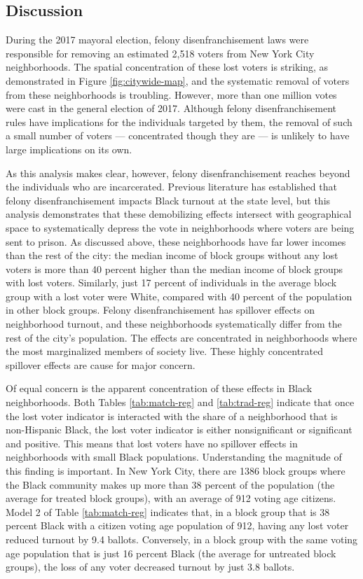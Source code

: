\documentclass[
  12pt,
]{article}
\begin{document}
\hypertarget{discussion}{%
\subsection*{Discussion}\label{discussion}}

During the 2017 mayoral election, felony disenfranchisement laws were responsible for removing an estimated 2,518 voters from New York City neighborhoods. The spatial concentration of these lost voters is striking, as demonstrated in Figure \ref{fig:citywide-map}, and the systematic removal of voters from these neighborhoods is troubling. However, more than one million votes were cast in the general election of 2017. Although felony disenfranchisement rules have implications for the individuals targeted by them, the removal of such a small number of voters --- concentrated though they are --- is unlikely to have large implications on its own.

As this analysis makes clear, however, felony disenfranchisement reaches beyond the individuals who are incarcerated. Previous literature has established that felony disenfranchisement impacts Black turnout at the state level, but this analysis demonstrates that these demobilizing effects intersect with geographical space to systematically depress the vote in neighborhoods where voters are being sent to prison. As discussed above, these neighborhoods have far lower incomes than the rest of the city: the median income of block groups without any lost voters is more than 40 percent higher than the median income of block groups with lost voters. Similarly, just 17 percent of individuals in the average block group with a lost voter were White, compared with 40 percent of the population in other block groups. Felony disenfranchisement has spillover effects on neighborhood turnout, and these neighborhoods systematically differ from the rest of the city's population. The effects are concentrated in neighborhoods where the most marginalized members of society live. These highly concentrated spillover effects are cause for major concern.

Of equal concern is the apparent concentration of these effects in Black neighborhoods. Both Tables \ref{tab:match-reg} and \ref{tab:trad-reg} indicate that once the lost voter indicator is interacted with the share of a neighborhood that is non-Hispanic Black, the lost voter indicator is either nonsignificant or significant and positive. This means that lost voters have no spillover effects in neighborhoods with small Black populations. Understanding the magnitude of this finding is important. In New York City, there are 1386 block groups where the Black community makes up more than 38 percent of the population (the average for treated block groups), with an average of 912 voting age citizens. Model 2 of Table \ref{tab:match-reg} indicates that, in a block group that is 38 percent Black with a citizen voting age population of 912, having any lost voter reduced turnout by 9.4 ballots. Conversely, in a block group with the same voting age population that is just 16 percent Black (the average for untreated block groups), the loss of any voter decreased turnout by just 3.8 ballots.
\end{document}
